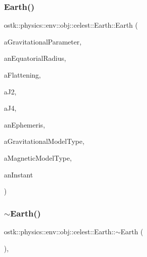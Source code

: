 \subsubsection{\texorpdfstring{Earth()}{Earth()}}
{\footnotesize\ttfamily ostk\+::physics\+::env\+::obj\+::celest\+::\+Earth\+::\+Earth (\begin{DoxyParamCaption}\item[{const \hyperlink{classostk_1_1physics_1_1units_1_1_derived}{Derived} \&}]{a\+Gravitational\+Parameter,  }\item[{const \hyperlink{classostk_1_1physics_1_1units_1_1_length}{Length} \&}]{an\+Equatorial\+Radius,  }\item[{const Real \&}]{a\+Flattening,  }\item[{const Real \&}]{a\+J2,  }\item[{const Real \&}]{a\+J4,  }\item[{const Shared$<$ \hyperlink{classostk_1_1physics_1_1env_1_1_ephemeris}{Ephemeris} $>$ \&}]{an\+Ephemeris,  }\item[{const \hyperlink{classostk_1_1physics_1_1environment_1_1gravitational_1_1_earth_a9895df78b5c5aab5e981bf765f8c0f05}{Earth\+Gravitational\+Model\+::\+Type} \&}]{a\+Gravitational\+Model\+Type,  }\item[{const \hyperlink{classostk_1_1physics_1_1environment_1_1magnetic_1_1_earth_a30a064d87b6fce338e76aebd3043b6b6}{Earth\+Magnetic\+Model\+::\+Type} \&}]{a\+Magnetic\+Model\+Type,  }\item[{const \hyperlink{classostk_1_1physics_1_1time_1_1_instant}{Instant} \&}]{an\+Instant }\end{DoxyParamCaption})}

\mbox{\label{classostk_1_1physics_1_1env_1_1obj_1_1celest_1_1_earth_ac718f964c68fa41331978751a9ca4818}} 
\subsubsection{\texorpdfstring{$\sim$\+Earth()}{~Earth()}}
{\footnotesize\ttfamily ostk\+::physics\+::env\+::obj\+::celest\+::\+Earth\+::$\sim$\+Earth (\begin{DoxyParamCaption}{ }\end{DoxyParamCaption})\hspace{0.3cm}{\ttfamily [override]}, {\ttfamily [virtual]}}



